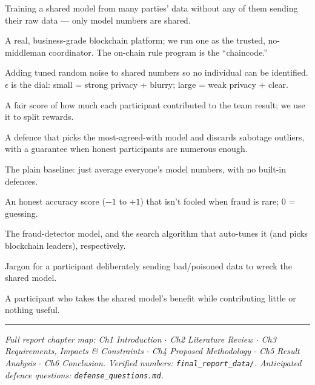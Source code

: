 \documentclass[11pt]{article}
\begin{document}
\begin{description}[leftmargin=0pt,style=nextline,itemsep=3pt]
  \item[Federated learning (FL)] Training a shared model from many parties' data without any of them
  sending their raw data --- only model numbers are shared.
  \item[Hyperledger Fabric] A real, business-grade blockchain platform; we run one as the trusted,
  no-middleman coordinator. The on-chain rule program is the ``chaincode.''
  \item[Differential privacy (DP) / $\epsilon$] Adding tuned random noise to shared numbers so no
  individual can be identified. $\epsilon$ is the dial: small = strong privacy + blurry; large = weak
  privacy + clear.
  \item[Shapley value ($\varphi$)] A fair score of how much each participant contributed to the team
  result; we use it to split rewards.
  \item[Krum] A defence that picks the most-agreed-with model and discards sabotage outliers, with a
  guarantee when honest participants are numerous enough.
  \item[FedAvg] The plain baseline: just average everyone's model numbers, with no built-in defences.
  \item[MCC] An honest accuracy score ($-1$ to $+1$) that isn't fooled when fraud is rare; $0$ = guessing.
  \item[ADTCN / DB-BOA] The fraud-detector model, and the search algorithm that auto-tunes it (and picks
  blockchain leaders), respectively.
  \item[Byzantine attack] Jargon for a participant deliberately sending bad/poisoned data to wreck the
  shared model.
  \item[Free-rider] A participant who takes the shared model's benefit while contributing little or
  nothing useful.
\end{description}

\vspace{0.5em}
\hrule
\vspace{0.4em}
{\footnotesize\color{soft}\itshape Full report chapter map: Ch1 Introduction $\cdot$ Ch2 Literature
Review $\cdot$ Ch3 Requirements, Impacts \& Constraints $\cdot$ Ch4 Proposed Methodology $\cdot$ Ch5
Result Analysis $\cdot$ Ch6 Conclusion. Verified numbers: \texttt{final\_report\_data/}. Anticipated
defence questions: \texttt{defense\_questions.md}.}
\end{document}
